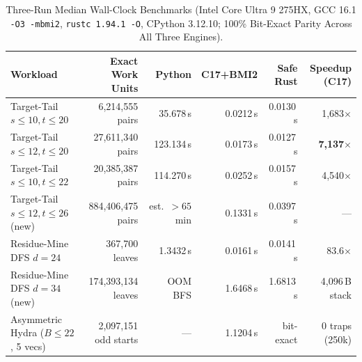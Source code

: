 \documentclass[11pt,reqno]{amsart}
\theoremstyle{plain}
\theoremstyle{definition}
\begin{document}
\begin{table}[htbp]
\centering
\caption{Three-Run Median Wall-Clock Benchmarks (Intel Core Ultra 9 275HX, GCC 16.1 \texttt{-O3 -mbmi2},
\texttt{rustc 1.94.1 -O}, CPython 3.12.10; 100\% Bit-Exact Parity Across All Three Engines).}
\label{tab:native_bench}
\scriptsize
\setlength{\tabcolsep}{4pt}
\begin{tabular}{@{}lrrrrr@{}}
\toprule
Workload & Exact Work Units & Python & C17+BMI2 & Safe Rust & Speedup (C17) \\
\midrule
Target-Tail $s\le 10, t\le 20$ & 6,214,555 pairs & 35.678\,s & 0.0212\,s & 0.0130\,s & 1,683$\times$ \\
Target-Tail $s\le 12, t\le 20$ & 27,611,340 pairs & 123.134\,s & 0.0173\,s & 0.0127\,s & \textbf{7,137$\times$} \\
Target-Tail $s\le 10, t\le 22$ & 20,385,387 pairs & 114.270\,s & 0.0252\,s & 0.0157\,s & 4,540$\times$ \\
Target-Tail $s\le 12, t\le 26$ (new) & 884,406,475 pairs & est.\ $>65$\,min & 0.1331\,s & 0.0397\,s & --- \\
Residue-Mine DFS $d = 24$ & 367,700 leaves & 1.3432\,s & 0.0161\,s & 0.0141\,s & 83.6$\times$ \\
Residue-Mine DFS $d = 34$ (new) & 174,393,134 leaves & OOM BFS & 1.6468\,s & 1.6813\,s & 4,096\,B stack \\
Asymmetric Hydra ($B\le 22$, 5 vecs) & 2,097,151 odd starts & --- & 1.1204\,s & bit-exact & 0 traps (250k) \\
\bottomrule
\end{tabular}
\end{table}
\end{document}
